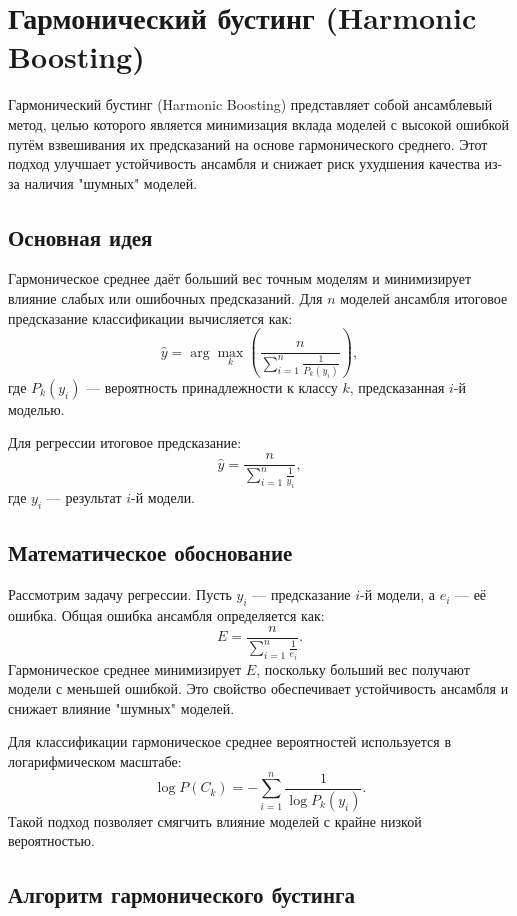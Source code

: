 \section*{Гармонический бустинг (Harmonic Boosting)}

Гармонический бустинг (Harmonic Boosting) представляет собой ансамблевый метод, целью которого является минимизация вклада моделей с высокой ошибкой путём взвешивания их предсказаний на основе гармонического среднего. Этот подход улучшает устойчивость ансамбля и снижает риск ухудшения качества из-за наличия "шумных" моделей.

\subsection*{Основная идея}

Гармоническое среднее даёт больший вес точным моделям и минимизирует влияние слабых или ошибочных предсказаний. Для \( n \) моделей ансамбля итоговое предсказание классификации вычисляется как:
\[
    \hat{y} = \arg\max_{k} \left( \frac{n}{\sum_{i=1}^n \frac{1}{P_k(y_i)}} \right),
\]
где \( P_k(y_i) \) — вероятность принадлежности к классу \( k \), предсказанная \( i \)-й моделью.

Для регрессии итоговое предсказание:
\[
    \hat{y} = \frac{n}{\sum_{i=1}^n \frac{1}{y_i}},
\]
где \( y_i \) — результат \( i \)-й модели.

\subsection*{Математическое обоснование}

Рассмотрим задачу регрессии. Пусть \( y_i \) — предсказание \( i \)-й модели, а \( e_i \) — её ошибка. Общая ошибка ансамбля определяется как:
\[
    E = \frac{n}{\sum_{i=1}^n \frac{1}{e_i}}.
\]
Гармоническое среднее минимизирует \( E \), поскольку больший вес получают модели с меньшей ошибкой. Это свойство обеспечивает устойчивость ансамбля и снижает влияние "шумных" моделей.

Для классификации гармоническое среднее вероятностей используется в логарифмическом масштабе:
\[
    \log P(C_k) = -\sum_{i=1}^n \frac{1}{\log P_k(y_i)}.
\]
Такой подход позволяет смягчить влияние моделей с крайне низкой вероятностью.

\subsection*{Алгоритм гармонического бустинга}

